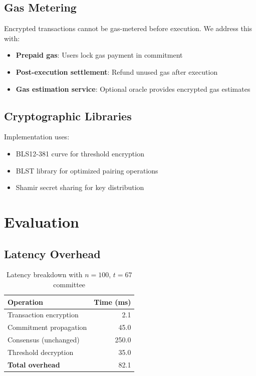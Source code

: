 \documentclass[11pt,a4paper]{article}
\theoremstyle{definition}
\begin{document}
\subsection{Gas Metering}

Encrypted transactions cannot be gas-metered before execution. We address this with:

\begin{itemize}
    \item \textbf{Prepaid gas}: Users lock gas payment in commitment
    \item \textbf{Post-execution settlement}: Refund unused gas after execution
    \item \textbf{Gas estimation service}: Optional oracle provides encrypted gas estimates
\end{itemize}

\subsection{Cryptographic Libraries}

Implementation uses:
\begin{itemize}
    \item BLS12-381 curve for threshold encryption
    \item BLST library for optimized pairing operations
    \item Shamir secret sharing for key distribution
\end{itemize}

\section{Evaluation}

\subsection{Latency Overhead}

\begin{table}[h]
\centering
\begin{tabular}{lr}
\toprule
\textbf{Operation} & \textbf{Time (ms)} \\
\midrule
Transaction encryption & 2.1 \\
Commitment propagation & 45.0 \\
Consensus (unchanged) & 250.0 \\
Threshold decryption & 35.0 \\
\midrule
\textbf{Total overhead} & 82.1 \\
\bottomrule
\end{tabular}
\caption{Latency breakdown with $n=100$, $t=67$ committee}
\end{table}
\end{document}
